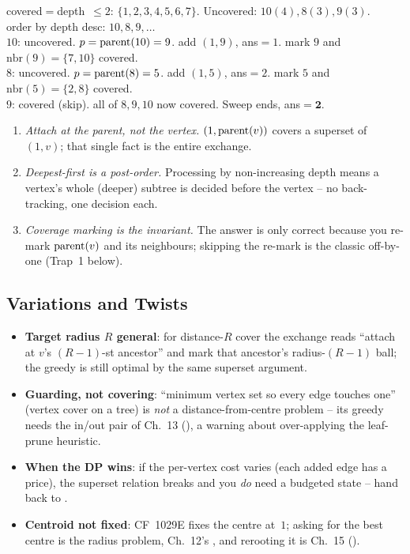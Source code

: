 \begin{tracebox}
covered$=$depth~$\le2$: $\{1,2,3,4,5,6,7\}$. Uncovered: $10(4), 8(3), 9(3)$.\\
order by depth desc: $10, 8, 9, \dots$\\
$10$: uncovered. $p=\operatorname{parent}(10)=9$. add $(1,9)$, ans$=1$. mark $9$ and
$\mathrm{nbr}(9)=\{7,10\}$ covered.\\
$8$: uncovered. $p=\operatorname{parent}(8)=5$. add $(1,5)$, ans$=2$. mark $5$ and
$\mathrm{nbr}(5)=\{2,8\}$ covered.\\
$9$: covered (skip). all of $8,9,10$ now covered. \;\;Sweep ends, ans$=\mathbf{2}$. \checkmark
\end{tracebox}

\begin{insightbox}
\begin{enumerate}[nosep, leftmargin=1.6em]
  \item \emph{Attach at the parent, not the vertex.} $(1,\operatorname{parent}(v))$ covers a
        superset of $(1,v)$; that single fact is the entire exchange.
  \item \emph{Deepest-first is a post-order.} Processing by non-increasing depth means
        a vertex's whole (deeper) subtree is decided before the vertex -- no
        back-tracking, one decision each.
  \item \emph{Coverage marking is the invariant.} The answer is only correct because
        you re-mark $\operatorname{parent}(v)$ and its neighbours; skipping the re-mark is the classic
        off-by-one (Trap~1 below).
\end{enumerate}
\end{insightbox}

\subsection{Variations and Twists}

\begin{itemize}[nosep]
  \item \textbf{Target radius $R$ general}: for distance-$R$ cover the exchange reads
        ``attach at $v$'s $(R{-}1)$-st ancestor'' and mark that ancestor's radius-$(R{-}1)$
        ball; the greedy is still optimal by the same superset argument. \hfill{}
  \item \textbf{Guarding, not covering}: ``minimum vertex set so every edge touches
        one'' (vertex cover on a tree) is \emph{not} a distance-from-centre problem --
        its greedy needs the in/out pair of Ch.~13 (), a warning
        about over-applying the leaf-prune heuristic. \hfill{}
  \item \textbf{When the DP wins}: if the per-vertex cost varies (each added edge has a
        price), the superset relation breaks and you \emph{do} need a budgeted state --
        hand back to . \hfill{}
  \item \textbf{Centroid not fixed}: CF~1029E fixes the centre at~$1$; asking for the best
        centre is the radius problem, Ch.~12's , and rerooting it is
        Ch.~15 (). \hfill{}
\end{itemize}

